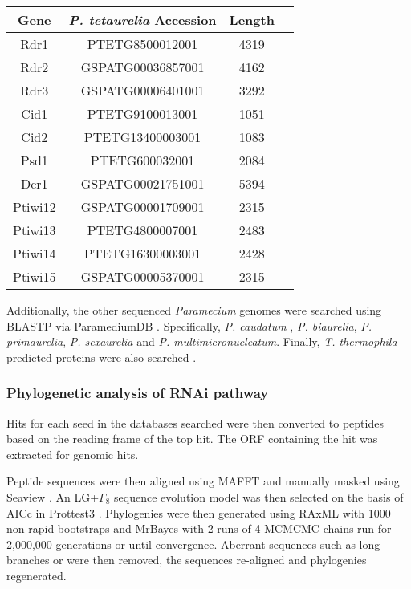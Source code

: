 \begin{table}
    \centering
    \begin{tabular}{|c|c|c|c|}
        \hline
        \textbf{Gene} & \textbf{\textit{P. tetaurelia} Accession} & \textbf{Length} \\
        \hline
        Rdr1 & PTETG8500012001 & 4319 \\ 
        Rdr2 & GSPATG00036857001 & 4162 \\
        Rdr3 & GSPATG00006401001 & 3292 \\
        Cid1 & PTETG9100013001 & 1051 \\
        Cid2 & PTETG13400003001 & 1083 \\
        Psd1 & PTETG600032001 & 2084 \\
        Dcr1 & GSPATG00021751001 & 5394 \\
        Ptiwi12 & GSPATG00001709001 & 2315 \\
        Ptiwi13 & PTETG4800007001 & 2483 \\
        Ptiwi14 & PTETG16300003001 & 2428 \\
        Ptiwi15 & GSPATG00005370001 & 2315 \\
        \hline
    \end{tabular}
    \caption[RNAi pathway components from Marker]{\citep{Marker2014}}
    \label{tab:rnai_seeds}
\end{table}

Additionally, the other sequenced \textit{Paramecium} genomes 
were searched using BLASTP via ParamediumDB \citep{Arnaiz2007,Arnaiz2011a}.
Specifically, \textit{P. caudatum} \citep{McGrath2014}, 
\textit{P. biaurelia}, \textit{P. primaurelia}, \textit{P. sexaurelia}
and \textit{P. multimicronucleatum}. Finally,  \textit{T. thermophila} 
predicted proteins were also searched \citep{Eisen2006}.


\subsubsection{Phylogenetic analysis of RNAi pathway}

Hits for each seed in the databases searched were then converted
to peptides based on the reading frame of the top hit. The ORF containing the
hit was extracted for genomic hits. 

Peptide sequences were then aligned using MAFFT \citep{Katoh2002} and manually
masked using Seaview \citep{Gouy2010}.
An LG+\(\Gamma_8\) sequence evolution model was then selected on the basis
of AICc in Prottest3 \citep{Darriba2011a}.
Phylogenies were then generated using RAxML with 1000 non-rapid bootstraps and MrBayes 
with 2 runs of 4 MCMCMC chains run for 2,000,000 generations or until convergence.
Aberrant sequences such as long branches or were then removed, the sequences
re-aligned and phylogenies regenerated.


